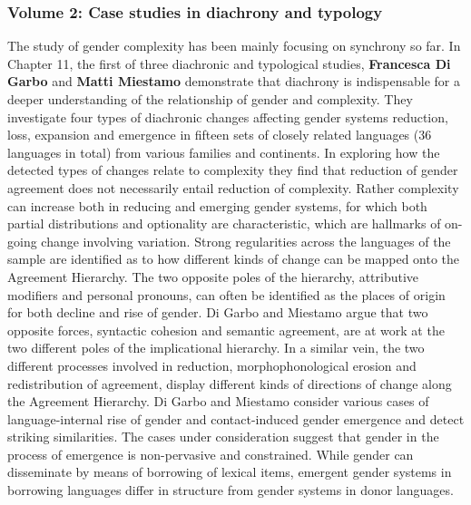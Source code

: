 \documentclass[output=collectionpaper]{langsci/langscibook}
\begin{document}
\subsubsection*{Volume 2: Case studies in diachrony and typology}
The study of gender complexity has been mainly focusing on synchrony so far. In Chapter 11, the first of three diachronic and typological studies, \textbf{Francesca Di Garbo} and \textbf{Matti Miestamo} demonstrate that diachrony is indispensable for a deeper understanding of the relationship of gender and complexity. They investigate four types of diachronic changes affecting gender systems \textendash{} reduction, loss, expansion and emergence \textendash{} in fifteen sets of closely related languages (36 languages in total) from various families and continents. In exploring how the detected types of changes relate to complexity they find that reduction of gender agreement does not necessarily entail reduction of complexity. Rather complexity can increase both in reducing and emerging gender systems, for which both partial distributions and optionality are characteristic, which are hallmarks of on-going change involving variation. Strong regularities across the languages of the sample are identified as to how different kinds of change can be mapped onto the Agreement Hierarchy. The two opposite poles of the hierarchy, attributive modifiers and personal pronouns, can often be identified as the places of origin for both decline and rise of gender. Di Garbo and Miestamo argue that two opposite forces, syntactic cohesion and semantic agreement, are at work at the two different poles of the implicational hierarchy. In a similar vein, the two different processes involved in reduction, morphophonological erosion and redistribution of agreement, display different kinds of directions of change along the Agreement Hierarchy. Di Garbo and Miestamo consider various cases of language-internal rise of gender and contact-induced gender emergence and detect striking similarities. The cases under consideration suggest that gender in the process of emergence is non-pervasive and constrained. While gender can disseminate by means of borrowing of lexical items, emergent gender systems in borrowing languages differ in structure from gender systems in donor languages.
\end{document}
